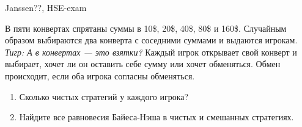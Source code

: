 \begin{problem}
\begin{source}
Janssen??, HSE-exam
\end{source}
В пяти конвертах спрятаны суммы в 10\$, 20\$, 40\$, 80\$ и 160\$. Случайным образом выбираются два конверта с соседними суммами и выдаются игрокам. {\it Тигр: А в конвертах — это взятки?} Каждый игрок открывает свой конверт и выбирает, хочет ли он оставить себе сумму или хочет обменяться. Обмен происходит, если оба игрока согласны обменяться.\par
\begin{enumerate}
\item	Сколько чистых стратегий у каждого игрока?\par
\item Найдите все равновесия Байеса-Нэша в чистых и смешанных стратегиях.
\end{enumerate}


\begin{sol}

\end{sol}
\end{problem}


